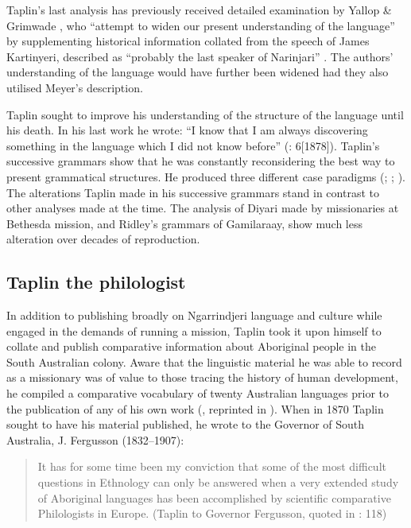 Taplin’s last analysis has previously received detailed examination by Yallop \& Grimwade \citeyearpar{grimwade_george_1975}, who “attempt to widen our present understanding of the language” \citep[8]{grimwade_george_1975} by supplementing historical information collated from the speech of James Kartinyeri, described as “probably the last speaker of Narinjari” \citep[1]{grimwade_george_1975}. The authors' understanding of the language would have further been widened had they also utilised Meyer’s description.

Taplin sought to improve his understanding of the structure of the language until his death. In his last work he wrote: “I know that I am always discovering something in the language which I did not know before” (\citeyear{taplin_grammar_1880}: 6[1878]). Taplin’s successive grammars show that he was constantly reconsidering the best way to present grammatical structures. He produced three different case paradigms (\citeyear{taplin_vocabulary_1867}; \citeyear{taplin_notes_1872}; \citeyear{taplin_grammar_1878}). The alterations Taplin made in his successive grammars stand in contrast to other analyses made at the time. The analysis of Diyari made by missionaries at Bethesda mission, and Ridley’s grammars of Gamilaraay, show much less alteration over decades of reproduction.

\subsection{Taplin the philologist}
\label{sec:key:7.3.1}\label{bkm:Ref514609035}\label{bkm:Ref514607617}

In addition to publishing broadly on Ngarrindjeri language and culture while engaged in the demands of running a mission, Taplin took it upon himself to collate and publish comparative information about Aboriginal people in the South Australian colony. Aware that the linguistic material he was able to record as a missionary was of value to those tracing the history of human development, he compiled a comparative vocabulary of twenty Australian languages prior to the publication of any of his own work (\citeyear{taplin_notes_1870}, reprinted in \citealt{grimwade_george_1975}). When in 1870 Taplin sought to have his material published, he wrote to the Governor of South Australia, J. Fergusson (1832--1907):

\newpage
\begin{quote}
It has for some time been my conviction that some of the most difficult questions in Ethnology can only be answered when a very extended study of Aboriginal languages has been accomplished by scientific comparative Philologists in Europe. (Taplin to Governor Fergusson, quoted in \citealt{grimwade_george_1975}: 118)
\end{quote}

